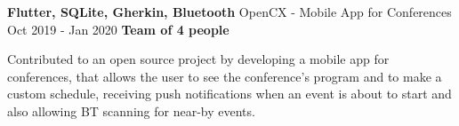 \cventry
  {\textbf{Flutter, SQLite, Gherkin, Bluetooth}} %
  {OpenCX - Mobile App for Conferences \href{https://github.com/EduRibeiro00/AMA-feup-esof}{\faExternalLink}} %
  {Oct 2019 - Jan 2020} %
  {\textbf{Team of 4 people}} %
  {
    \begin{cvitems} %
      \item {Contributed to an open source project by developing a mobile app for conferences, that allows the user to see the conference's program and to make a custom schedule, receiving push notifications when an event is about to start and also allowing BT scanning for near-by events.}
    \end{cvitems}
  }